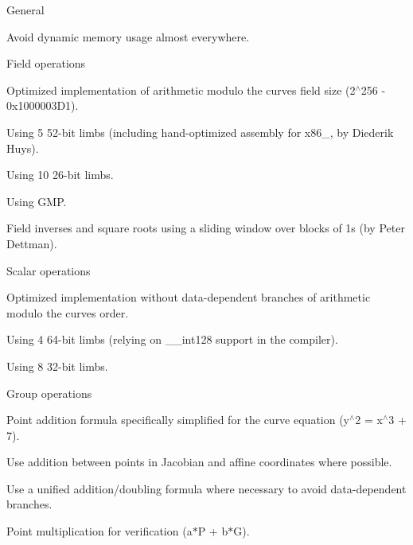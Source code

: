 \begin{DoxyItemize}
\item General
\begin{DoxyItemize}
\item Avoid dynamic memory usage almost everywhere.
\end{DoxyItemize}
\item Field operations
\begin{DoxyItemize}
\item Optimized implementation of arithmetic modulo the curve\textquotesingle{}s field size (2$^\wedge$256 -\/ 0x1000003\+D1).
\begin{DoxyItemize}
\item Using 5 52-\/bit limbs (including hand-\/optimized assembly for x86\+\_, by Diederik Huys).
\item Using 10 26-\/bit limbs.
\item Using G\+MP.
\end{DoxyItemize}
\item Field inverses and square roots using a sliding window over blocks of 1s (by Peter Dettman).
\end{DoxyItemize}
\item Scalar operations
\begin{DoxyItemize}
\item Optimized implementation without data-\/dependent branches of arithmetic modulo the curve\textquotesingle{}s order.
\begin{DoxyItemize}
\item Using 4 64-\/bit limbs (relying on \+\_\+\+\_\+int128 support in the compiler).
\item Using 8 32-\/bit limbs.
\end{DoxyItemize}
\end{DoxyItemize}
\item Group operations
\begin{DoxyItemize}
\item Point addition formula specifically simplified for the curve equation (y$^\wedge$2 = x$^\wedge$3 + 7).
\item Use addition between points in Jacobian and affine coordinates where possible.
\item Use a unified addition/doubling formula where necessary to avoid data-\/dependent branches.
\end{DoxyItemize}
\item Point multiplication for verification (a$\ast$P + b$\ast$G).
\begin{DoxyItemize}

\end{DoxyItemize}
\end{DoxyItemize}
